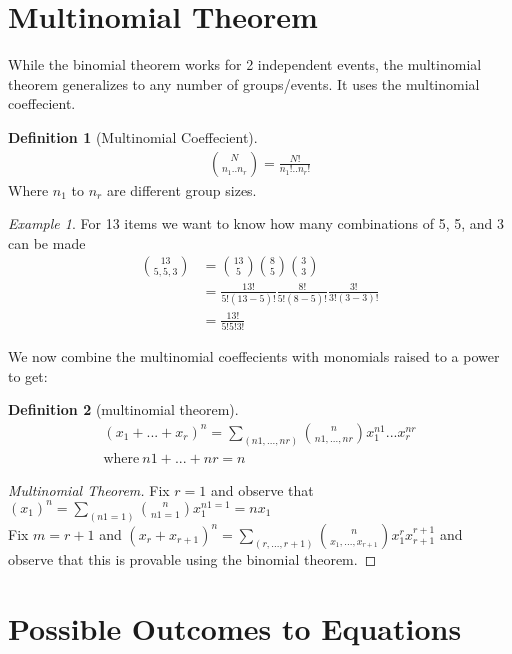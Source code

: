 \documentclass{article}
\theoremstyle{plain}
\theoremstyle{definition}
\newtheorem{definition}{Definition}
\theoremstyle{remark}
\newtheorem{example}{Example}
\begin{document}

\section{Multinomial Theorem}
While the binomial theorem works for 2 independent events, the multinomial theorem generalizes to any number of groups/events. It uses the multinomial coeffecient.
\begin{definition}[Multinomial Coeffecient]
  \begin{align*}
    \binom{N}{n_1..n_r} = \frac{N!}{n_1!..n_r!}
  \end{align*}
  Where $n_1$ to $n_r$ are different group sizes.
\end{definition}

\begin{example}
  For 13 items we want to know how many combinations of 5, 5, and 3 can be made
  \begin{align*}
    \binom{13}{5,5,3} &= \binom{13}{5}\binom{8}{5}\binom{3}{3} \\
                      &= \frac{13!}{5!(13-5)!}\frac{8!}{5!(8-5)!}\frac{3!}{3!(3-3)!} \\
                      &=\frac{13!}{5!5!3!}
  \end{align*}
\end{example}
We now combine the multinomial coeffecients with monomials raised to a power to get:
\begin{definition}[multinomial theorem]
  \begin{align*}
    (x_1+...+x_r)^n = \sum_{(n1,...,nr)}\binom{n}{n1,...,nr}x_1^{n1}...x_r^{nr} \\
    \text{where}\ n1 + ... + nr = n
  \end{align*}
\end{definition}
\begin{proof}[Multinomial Theorem]
  Fix $r = 1$ and observe that $(x_1)^n=\sum_{(n1 = 1)}\binom{n}{n1 = 1}x_1^{n1 = 1} = nx_1$ \\
  Fix $m = r + 1$ and $(x_r + x_{r+1})^n = \sum_{(r, ..., r+1)}\binom{n}{x_1,...,x_{r+1}}x_1^rx_{r+1}^{r+1}$  and observe that this is provable using the binomial theorem.
\end{proof}

\section{Possible Outcomes to Equations}
\end{document}
